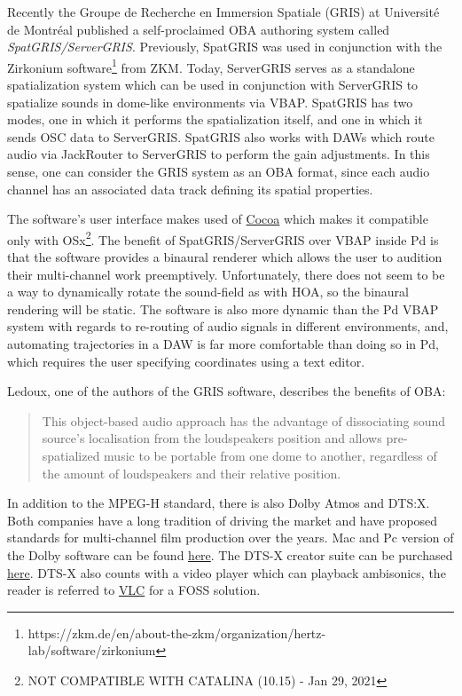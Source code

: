 Recently the Groupe de Recherche en Immersion Spatiale (GRIS) at Université de Montréal published a self-proclaimed OBA authoring system called \textit{SpatGRIS/ServerGRIS}. Previously, SpatGRIS was used in conjunction with the Zirkonium software\footnote{https://zkm.de/en/about-the-zkm/organization/hertz-lab/software/zirkonium} from ZKM. Today, ServerGRIS serves as a standalone spatialization system which can be used in conjunction with ServerGRIS to spatialize sounds in dome-like environments via VBAP. SpatGRIS has two modes, one in which it performs the spatialization itself, and one in which it sends OSC data to ServerGRIS. SpatGRIS also works with DAWs which route audio via JackRouter to ServerGRIS to perform the gain adjustments. In this sense, one can consider the GRIS system as an OBA format, since each audio channel has an associated data track defining its spatial properties.

The software's user interface makes used of \href{https://en.wikipedia.org/wiki/Cocoa_(API)}{Cocoa} which makes it compatible only with OSx\footnote{NOT COMPATIBLE WITH CATALINA (10.15) - Jan 29, 2021}. The benefit of SpatGRIS/ServerGRIS over VBAP inside Pd is that the software provides a binaural renderer which allows the user to audition their multi-channel work preemptively. Unfortunately, there does not seem to be a way to dynamically rotate the sound-field as with HOA, so the binaural rendering will be static. The software is also more dynamic than the Pd VBAP system with regards to re-routing of audio signals in different environments, and, automating trajectories in a DAW is far more comfortable than doing so in Pd, which requires the user specifying coordinates using a text editor. 

Ledoux, one of the authors of the GRIS software, describes the benefits of OBA:

\begin{quote}
    This object-based audio approach has the advantage of dissociating sound source’s localisation from the loudspeakers position and allows pre-spatialized music to be portable from one dome to another, regardless of the amount of loudspeakers and their relative position. \cite{ledoux2018immersive}
\end{quote}

In addition to the MPEG-H standard, there is also Dolby Atmos and DTS:X. Both companies have a long tradition of driving the market and have proposed standards for multi-channel film production over the years. Mac and Pc version of the Dolby software can be found \href{https://developer.dolby.com/tools-media/production-tools/dolby-atmos-mastering-suite-updates/downloads/#!}{here}. The DTS-X creator suite can be purchased \href{https://dts.com/production-tools/#creator-suite}{here}. DTS-X also counts with a video player which can playback ambisonics, the reader is referred to \href{https://www.videolan.org/vlc/releases/3.0.0.html}{VLC} for a FOSS solution. 

